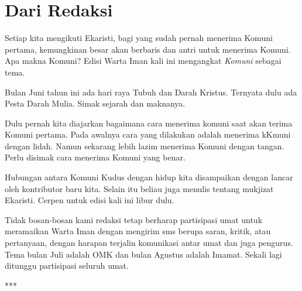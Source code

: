 \newpage

\chapter*{Dari Redaksi}
\footnotesize
{}
Setiap kita mengikuti Ekaristi, bagi yang sudah pernah menerima Komuni pertama, kemungkinan besar akan berbaris dan antri untuk menerima Komuni. Apa makna Komuni?
Edisi Warta Iman kali ini mengangkat \textit{Komuni} sebagai tema.  

\bigskip
Bulan Juni tahun ini ada hari raya Tubuh dan Darah Kristus. Ternyata dulu ada Pesta Darah Mulia. Simak sejarah dan maknanya. 

\bigskip
Dulu pernah kita diajarkan bagaimana cara menerima komuni saat akan terima Komuni pertama. Pada awalnya cara yang dilakukan adalah menerima kKmuni dengan lidah. Namun sekarang lebih lazim menerima Komuni dengan tangan. Perlu disimak cara menerima Komuni yang benar. 

\bigskip
Hubungan antara Komuni Kudus dengan hidup kita disampaikan dengan lancar oleh kontributor baru kita. Selain itu beliau juga menulis tentang mukjizat Ekaristi. 
Cerpen untuk edisi kali ini libur dulu.

\bigskip
Tidak bosan-bosan kami redaksi tetap berharap partisipasi umat untuk meramaikan Warta Iman dengan mengirim sms berupa saran, kritik, atau pertanyaan, dengan harapan terjalin komunikasi antar umat dan juga pengurus. Tema bulan Juli adalah OMK dan bulan Agustus adalah Imamat. Sekali lagi ditunggu partisipasi seluruh umat.
\normalsize

\begin{center}***\end{center} 

\vfill

\normalsize

